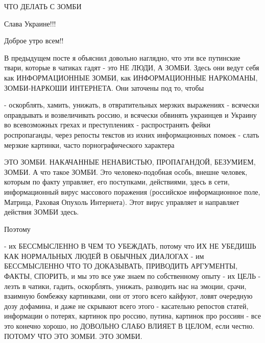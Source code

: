  
 
 
 
 





ЧТО ДЕЛАТЬ С ЗОМБИ

Слава Украине!!! 💛 💙 💛 💙 💛 💙

Доброе утро всем!!

В предыдущем посте я объяснил довольно наглядно, что эти все путинские твари,
которые в чатиках гадят - это НЕ ЛЮДИ, А ЗОМБИ. Здесь они ведут себя как
ИНФОРМАЦИОННЫЕ ЗОМБИ, как ИНФОРМАЦИОННЫЕ НАРКОМАНЫ, ЗОМБИ-НАРКОШИ ИНТЕРНЕТА.
Они заточены под то, чтобы

- оскорблять, хамить, унижать, в отвратительных мерзких выражениях
- всячески оправдывать и возвеличивать россию, и всячески обвинять украинцев и Украину во всевозможных грехах и преступлениях
- распространять фейки роспропаганды, через репосты текстов из ихних информационных помоек
- слать мерзкие картинки, часто порнографического характера 

ЭТО ЗОМБИ. НАКАЧАННЫЕ НЕНАВИСТЬЮ, ПРОПАГАНДОЙ, БЕЗУМИЕМ, ЗОМБИ. А что такое
ЗОМБИ. Это человеко-подобная особь, внешне человек, которым по факту управляет,
его поступками, действиями, здесь в сети, информационный вирус массового
поражения (российское информационное поле, Матрица, Раховая Опухоль Интернета).
Этот вирус управляет и направляет действия ЗОМБИ здесь. 

Поэтому

- их БЕССМЫСЛЕННО В ЧЕМ ТО УБЕЖДАТЬ, потому что ИХ НЕ УБЕДИШЬ КАК НОРМАЛЬНЫХ ЛЮДЕЙ В ОБЫЧНЫХ ДИАЛОГАХ
- им БЕССМЫСЛЕННО ЧТО ТО ДОКАЗЫВАТЬ, ПРИВОДИТЬ АРГУМЕНТЫ, ФАКТЫ, СПОРИТЬ, и мы это все уже знаем по собственному опыту
- их ЦЕЛЬ - лезть в чатики, гадить, оскорблять, унижать, разводить нас на эмоции, срачи, взаимную бомбежку картинками, они от этого всего кайфуют, ловят очередную дозу дофамина, и даже не скрывают всего этого
- касательно репостов статей, информации о потерях, картинок про россию, путина, картинок про россиян - все это конечно хорошо, но ДОВОЛЬНО СЛАБО ВЛИЯЕТ В ЦЕЛОМ, если честно. ПОТОМУ ЧТО ЭТО ЗОМБИ. ЭТО ЗОМБИ.

